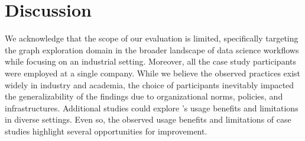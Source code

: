 \section{Discussion}
\label{sec:discuss}
We acknowledge that the scope of our evaluation is limited, specifically targeting the graph exploration domain in the broader landscape of data science workflows while focusing on an industrial setting. Moreover, all the case study participants were employed at a single company. 
While we believe the observed practices
exist widely in industry and academia, the choice of participants inevitably impacted the generalizability of the findings due to organizational norms, policies, and infrastructures. Additional studies could explore \system's usage benefits and limitations in diverse settings.
Even so, the observed usage benefits and limitations of case studies highlight several opportunities for improvement. 



